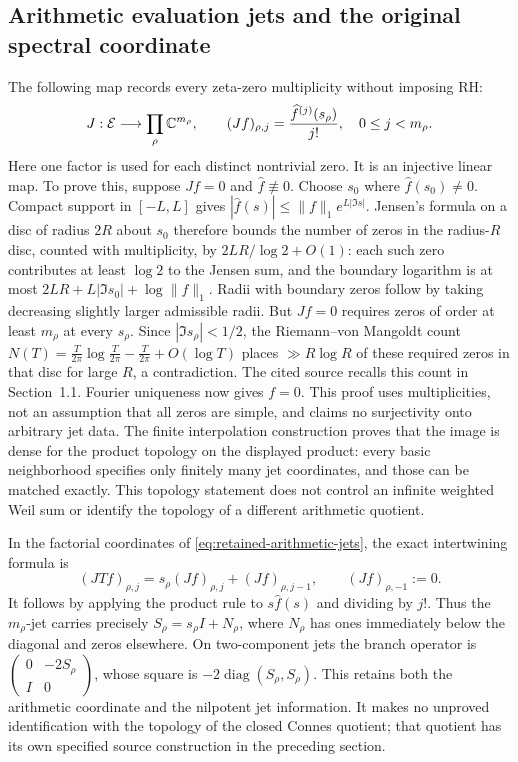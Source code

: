 \subsection{Arithmetic evaluation jets and the original spectral coordinate}
The following map records every zeta-zero multiplicity without imposing RH:
\begin{equation}
 J:\mathcal E\longrightarrow
 \prod_{\rho}\mathbb C^{m_\rho},\qquad
 (Jf)_{\rho,j}=\frac{\widehat f^{(j)}(s_\rho)}{j!},
 \quad 0\le j<m_\rho.
 \label{eq:retained-arithmetic-jets}
\end{equation}
Here one factor is used for each distinct nontrivial zero.
It is an injective linear map. To prove this, suppose $Jf=0$ and
$\widehat f\not\equiv0$. Choose $s_0$ where $\widehat f(s_0)\ne0$.
Compact support in $[-L,L]$ gives
$|\widehat f(s)|\le\|f\|_1e^{L|\Im s|}$.
Jensen's formula on a disc of radius $2R$ about $s_0$ therefore bounds
the number of zeros in the radius-$R$ disc, counted with multiplicity,
by $2LR/\log2+O(1)$: each such zero contributes at least $\log2$
to the Jensen sum, and the boundary logarithm is at most
$2LR+L|\Im s_0|+\log\|f\|_1$.
Radii with boundary zeros follow by taking decreasing slightly larger
admissible radii. But $Jf=0$ requires zeros of order at least
$m_\rho$ at every $s_\rho$. Since
$|\Im s_\rho|<1/2$, the Riemann--von Mangoldt count
$N(T)=\frac{T}{2\pi}\log\frac{T}{2\pi}-\frac{T}{2\pi}+O(\log T)$
places $\gg R\log R$ of these required zeros in that disc for large
$R$, a contradiction. The cited source recalls this count in
Section~1.1\cite{alpogeFurman2026}. Fourier uniqueness now gives
$f=0$. This proof uses multiplicities, not an assumption that all
zeros are simple, and claims no surjectivity onto arbitrary jet data.
The finite interpolation construction proves that the image is
dense for the product topology on the displayed product: every
basic neighborhood specifies only finitely many jet coordinates,
and those can be matched exactly. This topology statement does not
control an infinite weighted Weil sum or identify the topology of
a different arithmetic quotient.

In the factorial coordinates of \eqref{eq:retained-arithmetic-jets},
the exact intertwining formula is
\begin{equation}
 (JTf)_{\rho,j}
   =s_\rho(Jf)_{\rho,j}+(Jf)_{\rho,j-1},
 \qquad (Jf)_{\rho,-1}:=0.
 \label{eq:retained-jet-jordan}
\end{equation}
It follows by applying the product rule to $s\widehat f(s)$ and
dividing by $j!$. Thus the $m_\rho$-jet carries precisely
$S_\rho=s_\rho I+N_\rho$, where $N_\rho$ has ones immediately
below the diagonal and zeros elsewhere. On two-component jets the
branch operator is $\left(\begin{smallmatrix}0&-2S_\rho\\I&0\end{smallmatrix}\right)$,
whose square is $-2\operatorname{diag}(S_\rho,S_\rho)$.
This retains both the arithmetic coordinate and the nilpotent jet
information. It makes no unproved identification with the topology
of the closed Connes quotient; that quotient has its own specified
source construction in the preceding section.

